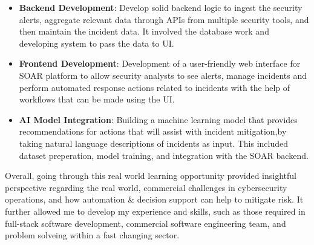 \begin{itemize}
    \item \textbf{Backend Development}: Develop solid backend logic to ingest the security alerts, aggregate relevant data through APIs from multiple security tools, and then maintain the incident data.  It involved the database work and developing system to pass the data to UI.
    \item \textbf{Frontend Development}: Development of a user-friendly web interface for SOAR platform to allow security analysts to see alerts, manage incidents and perform automated response actions related to incidents with the help of workflows that can be made using the UI.
    \item \textbf{AI Model Integration}: Building a machine learning model that provides recommendations for actions that will assist with incident mitigation,by taking natural language descriptions of incidents as input. This included dataset preperation, model training, and integration with the SOAR backend.
\end{itemize}
Overall, going through this real world learning opportunity provided insightful perspective regarding the real world, commercial challenges in cybersecurity operations, and how automation \& decision support can help to mitigate risk. It further allowed me to develop my experience and skills, such as those required in full-stack software development, commercial software engineering team, and problem solveing within a fast changing sector. 